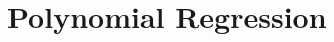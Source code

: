 \documentclass[aspectratio=169,usenames,dvipsnames]{beamer}
\newcommand{\InstructorNotes}[1]{\textit{\color{orange}#1}}
\renewcommand{\InstructorNotes}[1]{}
\begin{document}
  



\section{Polynomial Regression}
\end{document}
